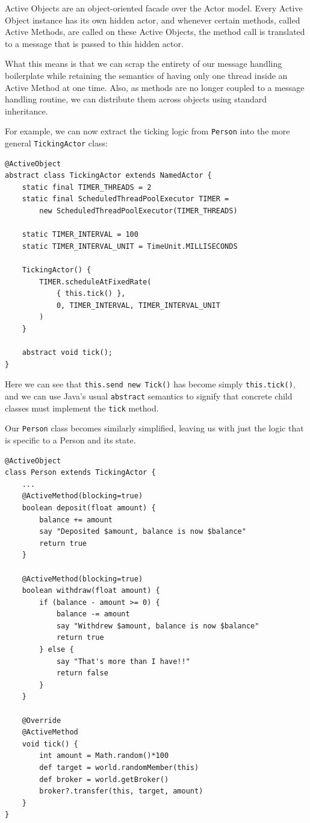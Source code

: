 \documentclass[a4paper,12pt]{kth-mag}
\begin{document}
Active Objects are an object-oriented facade over the Actor model. Every Active Object instance has its own hidden actor, and whenever certain methods, called Active Methods, are called on these Active Objects, the method call is translated to a message that is passed to this hidden actor.

What this means is that we can scrap the entirety of our message handling boilerplate while retaining the semantics of having only one thread inside an Active Method at one time. Also, as methods are no longer coupled to a message handling routine, we can distribute them across objects using standard inheritance.

For example, we can now extract the ticking logic from \texttt{Person} into the more general \texttt{TickingActor} class:

\begin{listing}[H]
	\begin{verbatim}
@ActiveObject
abstract class TickingActor extends NamedActor {
    static final TIMER_THREADS = 2
    static final ScheduledThreadPoolExecutor TIMER = 
        new ScheduledThreadPoolExecutor(TIMER_THREADS)

    static TIMER_INTERVAL = 100
    static TIMER_INTERVAL_UNIT = TimeUnit.MILLISECONDS

    TickingActor() {
        TIMER.scheduleAtFixedRate(
            { this.tick() },
            0, TIMER_INTERVAL, TIMER_INTERVAL_UNIT
        )
    }

    abstract void tick();
}
	\end{verbatim}
\end{listing}	

Here we can see that \texttt{this.send new Tick()} has become simply \texttt{this.tick()}, and we can use Java's usual \texttt{abstract} semantics to signify that concrete child classes must implement the \texttt{tick} method.

Our \texttt{Person} class becomes similarly simplified, leaving us with just the logic that is specific to a Person and its state.

\begin{listing}[H]
	\begin{verbatim}
@ActiveObject
class Person extends TickingActor {
    ...
    @ActiveMethod(blocking=true)
    boolean deposit(float amount) {
        balance += amount
        say "Deposited $amount, balance is now $balance"
        return true
    }

    @ActiveMethod(blocking=true)
    boolean withdraw(float amount) {
        if (balance - amount >= 0) {
            balance -= amount
            say "Withdrew $amount, balance is now $balance"
            return true
        } else {
            say "That's more than I have!!"
            return false
        }
    }

    @Override
    @ActiveMethod
    void tick() {
        int amount = Math.random()*100
        def target = world.randomMember(this)
        def broker = world.getBroker()
        broker?.transfer(this, target, amount)
    }
}
	\end{verbatim}
\end{listing}	
\end{document}
